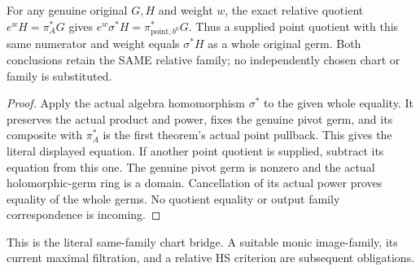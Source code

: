 \begin{theorem}
\label{hir:actual-relative-point-prescribed-normalized-family}
\leanok
For any genuine original $G,H$ and weight $w$, the exact relative quotient
$e^wH=\pi_A^*G$ gives
$e^w\sigma^*H=\pi_{\mathrm{point},b^0}^*G$.
Thus a supplied point quotient with this same numerator and weight equals
$\sigma^*H$ as a whole original germ. Both conclusions retain the SAME
relative family; no independently chosen chart or family is substituted.
\end{theorem}
\begin{proof}
Apply the actual algebra homomorphism $\sigma^*$ to the given whole equality.
It preserves the actual product and power, fixes the genuine pivot germ, and
its composite with $\pi_A^*$ is the first theorem's actual point pullback.
This gives the literal displayed equation. If another point quotient is
supplied, subtract its equation from this one. The genuine pivot germ is
nonzero and the actual holomorphic-germ ring is a domain. Cancellation of
its actual power proves equality of the whole germs. No quotient equality
or output family correspondence is incoming.
\end{proof}

This is the literal same-family chart bridge. A suitable monic image-family, its current maximal filtration, and a relative HS criterion are subsequent obligations.
